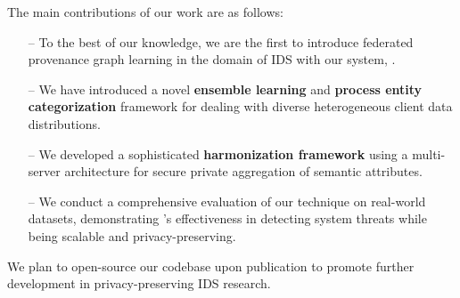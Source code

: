 The main contributions of our work are as follows:

\begin{itemize}[topsep=.1ex,itemsep=-.1ex,leftmargin=*]
    \item[--] To the best of our knowledge, we are the first to introduce federated provenance graph learning in the domain of IDS with our system, \Sys.
    \item[--] We have introduced a novel \textbf{ensemble learning} and \textbf{process entity categorization} framework for dealing with diverse heterogeneous client data distributions.
    \item[--] We developed a sophisticated \textbf{\wordvec harmonization framework} using a multi-server architecture for secure private aggregation of semantic attributes.
    \item[--] We conduct a comprehensive evaluation of our technique on real-world datasets, demonstrating \Sys's effectiveness in detecting system threats while being scalable and privacy-preserving.
\end{itemize}

 We plan to open-source our codebase upon publication to promote further development in privacy-preserving IDS research. %